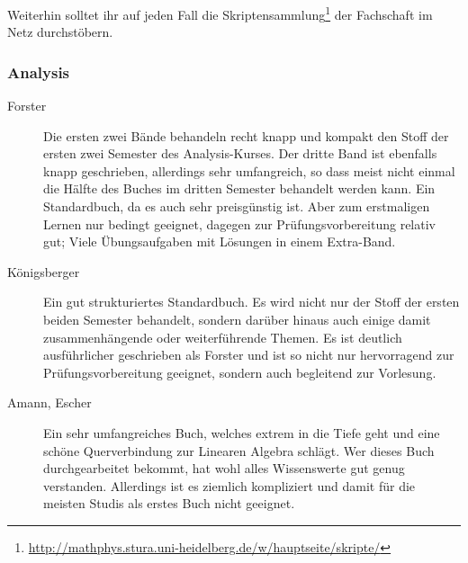 Weiterhin solltet ihr auf jeden Fall die Skriptensammlung\footnote{\url{http://mathphys.stura.uni-heidelberg.de/w/hauptseite/skripte/}} der Fachschaft im Netz durchstöbern.

\subsubsection{Analysis}
\begin{description}
\item[Forster]{
		Die ersten zwei Bände behandeln recht knapp und kompakt den Stoff der ersten zwei Semester des Analysis-Kurses. Der dritte Band ist ebenfalls knapp geschrieben, allerdings sehr umfangreich, so dass meist nicht einmal die Hälfte des Buches im dritten Semester behandelt werden kann. Ein Standardbuch, da es auch sehr preisgünstig ist. Aber zum erstmaligen Lernen nur bedingt geeignet, dagegen zur Prüfungsvorbereitung relativ gut; Viele Übungsaufgaben mit Lösungen in einem Extra-Band.}

\item[Königsberger]{
		Ein gut strukturiertes Standardbuch. Es wird nicht nur der Stoff der ersten beiden Semester behandelt, sondern darüber hinaus auch einige damit zusammenhängende oder weiterführende Themen. Es ist deutlich ausführlicher geschrieben als Forster und ist so nicht nur hervorragend zur Prüfungsvorbereitung geeignet, sondern auch begleitend zur Vorlesung.}

\item[Amann, Escher]{
		Ein sehr umfangreiches Buch, welches extrem in die Tiefe geht und eine schöne Querverbindung zur Linearen Algebra schlägt. Wer dieses Buch durchgearbeitet bekommt, hat wohl alles Wissenswerte gut genug verstanden. Allerdings ist es ziemlich kompliziert und damit für die meisten Studis als erstes Buch nicht geeignet.}
\end{description}


